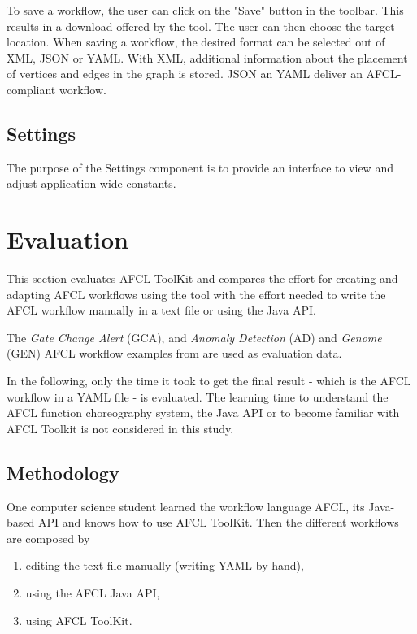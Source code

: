 \documentclass[a4paper,top=25mm,bottom=25mm,12pt,pdftex,halfparskip,twoside,bibtotoc,numbers=noenddot]{scrbook}
\begin{document}
To save a workflow, the user can click on the "Save" button in the toolbar.
This results in a download offered by the tool. The user can then choose the target location.  When saving a workflow, the desired format can be selected out of XML, JSON or YAML. With XML, additional information about the placement of vertices and edges in the graph is stored. JSON an YAML deliver an AFCL-compliant workflow.

\section{Settings}

The purpose of the Settings component is to provide an interface to view and adjust application-wide constants. 


\chapter{Evaluation}

This section evaluates AFCL ToolKit and compares the effort for creating and adapting AFCL workflows using the tool with the effort needed to write the AFCL workflow manually in a text file or using the Java API.

The \textit{Gate Change Alert}  (GCA), and \textit{Anomaly Detection} (AD) and \textit{Genome} (GEN) AFCL workflow examples from \citep{online-afcl-dps} are used as evaluation data.

In the following, only the time it took to get the final result - which is the AFCL workflow in a YAML file - is evaluated.
The learning time to understand the AFCL function choreography system, the Java API or to become familiar with AFCL Toolkit is not considered in this study.

\section{Methodology}

One computer science student learned the workflow language AFCL, its Java-based API and knows how to use AFCL ToolKit.
Then the different workflows are composed by
\begin{enumerate}[label={(\arabic*)}]
	\item editing the text file manually (writing YAML by hand),
	\item using the AFCL Java API,
	\item using AFCL ToolKit.
\end{enumerate}
\end{document}
